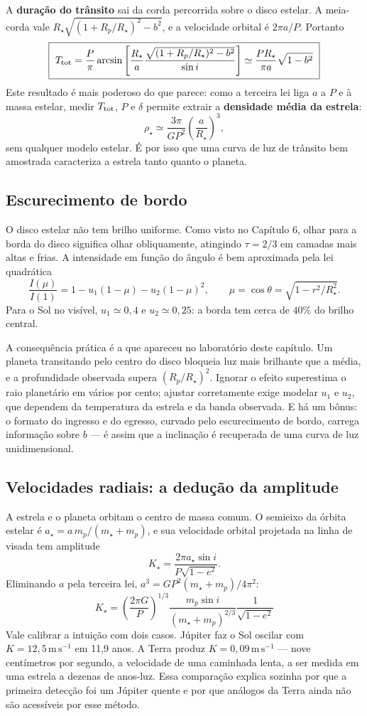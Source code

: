 \documentclass[11pt,a4paper]{article}
\begin{document}
A \textbf{duração do trânsito} sai da corda percorrida sobre o disco estelar. A meia-corda vale $R_\star\sqrt{(1+R_p/R_\star)^{2}-b^{2}}$, e a velocidade orbital é $2\pi a/P$. Portanto
\[
\boxed{\ T_{\rm tot}=\frac{P}{\pi}\arcsin\left[\frac{R_\star}{a}\frac{\sqrt{(1+R_p/R_\star)^{2}-b^{2}}}{\sin i}\right]\simeq\frac{PR_\star}{\pi a}\sqrt{1-b^{2}}\ }
\]
Este resultado é mais poderoso do que parece: como a terceira lei liga $a$ a $P$ e à massa estelar, medir $T_{\rm tot}$, $P$ e $\delta$ permite extrair a \textbf{densidade média da estrela}:
\[
\rho_\star\simeq\frac{3\pi}{GP^{2}}\left(\frac{a}{R_\star}\right)^{3},
\]
sem qualquer modelo estelar. É por isso que uma curva de luz de trânsito bem amostrada caracteriza a estrela tanto quanto o planeta.

\subsection*{Escurecimento de bordo}

O disco estelar não tem brilho uniforme. Como visto no Capítulo 6, olhar para a borda do disco significa olhar obliquamente, atingindo $\tau=2/3$ em camadas mais altas e frias. A intensidade em função do ângulo é bem aproximada pela lei quadrática
\[
\frac{I(\mu)}{I(1)}=1-u_1(1-\mu)-u_2(1-\mu)^{2},
\qquad
\mu=\cos\theta=\sqrt{1-r^{2}/R_\star^{2}}.
\]
Para o Sol no visível, $u_1\simeq0{,}4$ e $u_2\simeq0{,}25$: a borda tem cerca de $40\%$ do brilho central.

A consequência prática é a que apareceu no laboratório deste capítulo. Um planeta transitando pelo centro do disco bloqueia luz mais brilhante que a média, e a profundidade observada supera $(R_p/R_\star)^{2}$. Ignorar o efeito superestima o raio planetário em vários por cento; ajustar corretamente exige modelar $u_1$ e $u_2$, que dependem da temperatura da estrela e da banda observada. E há um bônus: o formato do ingresso e do egresso, curvado pelo escurecimento de bordo, carrega informação sobre $b$ --- é assim que a inclinação é recuperada de uma curva de luz unidimensional.

\subsection*{Velocidades radiais: a dedução da amplitude}

A estrela e o planeta orbitam o centro de massa comum. O semieixo da órbita estelar é $a_\star=a\,m_p/(m_\star+m_p)$, e sua velocidade orbital projetada na linha de visada tem amplitude
\[
K_\star=\frac{2\pi a_\star\sin i}{P\sqrt{1-e^{2}}}.
\]
Eliminando $a$ pela terceira lei, $a^{3}=GP^{2}(m_\star+m_p)/4\pi^{2}$:
\[
\boxed{\ K_\star=\left(\frac{2\pi G}{P}\right)^{1/3}\frac{m_p\sin i}{(m_\star+m_p)^{2/3}}\frac{1}{\sqrt{1-e^{2}}}\ }
\]
Vale calibrar a intuição com dois casos. Júpiter faz o Sol oscilar com $K=12{,}5\,\mathrm{m\,s^{-1}}$ em 11,9 anos. A Terra produz $K=0{,}09\,\mathrm{m\,s^{-1}}$ --- nove centímetros por segundo, a velocidade de uma caminhada lenta, a ser medida em uma estrela a dezenas de anos-luz. Essa comparação explica sozinha por que a primeira detecção foi um Júpiter quente e por que análogos da Terra ainda não são acessíveis por esse método.
\end{document}
